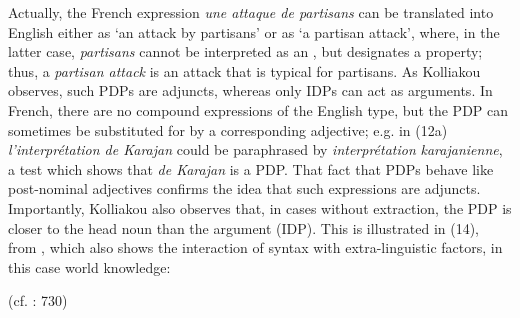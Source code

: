 \documentclass[output=paper]{langsci/langscibook}
\begin{document}
Actually, the French expression \textit{une attaque de partisans} can be translated into English either as ‘an attack by partisans’ or as ‘a partisan attack’, where, in the latter case, \textit{partisans} cannot be interpreted as an \AGENT, but designates a property; thus, a \textit{partisan attack} is an attack that is typical for partisans. As Kolliakou observes, such PDPs are adjuncts, whereas only IDPs can act as arguments. In French, there are no compound expressions of the English type, but the PDP can sometimes be substituted for by a corresponding adjective; e.g. in (12a) \textit{l’interprétation de Karajan} could be paraphrased by \textit{interprétation} \textit{karajanienne}, a test which shows that \textit{de Karajan} is a PDP. That fact that PDPs behave like post-nominal adjectives confirms the idea that such expressions are adjuncts. Importantly, Kolliakou also observes that, in cases without extraction, the PDP is closer to the head noun than the argument (IDP). This is illustrated in (14), from \citet[714]{Kolliakou1999}, which also shows the interaction of syntax with extra-linguistic factors, in this case world knowledge:

\ea%
    \label{ex:mensch:14}
    \glt (cf. \citealt{Kolliakou1999}: 730)
    \z
\z    
\end{document}

